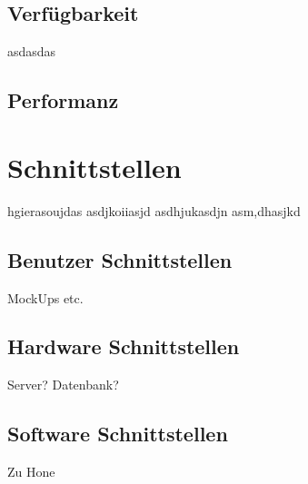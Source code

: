	\subsection{Verfügbarkeit}
		asdasdas
		
	\subsection{Performanz}
	
\section{Schnittstellen}
hgierasoujdas asdjkoiiasjd asdhjukasdjn asm,dhasjkd

	\subsection{Benutzer Schnittstellen}
		MockUps etc.
		
	\subsection{Hardware Schnittstellen}
		Server? Datenbank?		
		
	\subsection{Software Schnittstellen}
		Zu Hone
